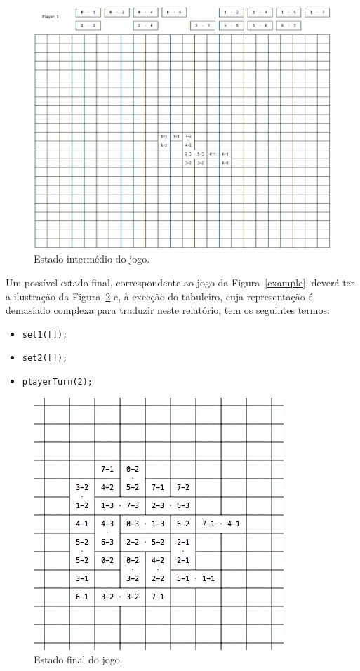 \documentclass[a4paper]{article}
\begin{document}
\begin{figure}[h!]
\begin{center}
\includegraphics[scale=0.5]{intermediate.jpg}
\caption{Estado intermédio do jogo.}
\label{intermediate}
\end{center}
\end{figure}

Um possível estado final, correspondente ao jogo da Figura~\ref{example}, deverá ter a ilustração da Figura~\ref{over} e, à exceção do tabuleiro, cuja representação é demasiado complexa para traduzir neste relatório, tem os seguintes termos:
\begin{itemize}
\item 
\verb|set1([]);|
\item
\verb|set2([]);|
\item \verb|playerTurn(2);|	
\end{itemize}

\begin{figure}[h!]
\begin{center}
\includegraphics[scale=1]{over.jpg}
\caption{Estado final do jogo.}
\label{over}
\end{center}
\end{figure}
\end{document}
